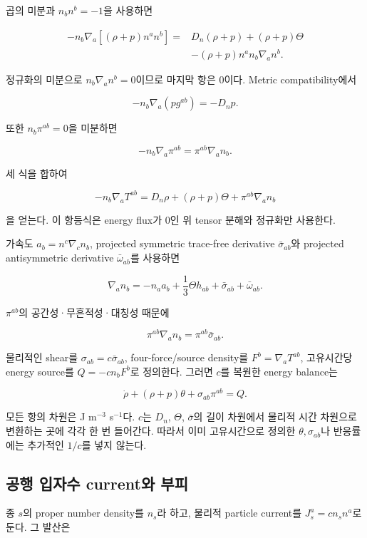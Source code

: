 곱의 미분과 \(n_bn^b=-1\)을 사용하면

\[
\begin{aligned}
-n_b\nabla_a[(\rho+p)n^an^b]
={}&D_n(\rho+p)+(\rho+p)\Theta\\
 &-(\rho+p)n^an_b\nabla_an^b.
\end{aligned}
\]

정규화의 미분으로 \(n_b\nabla_an^b=0\)이므로 마지막 항은 0이다. Metric compatibility에서

\[
-n_b\nabla_a(p g^{ab})=-D_np.
\]

또한 \(n_b\pi^{ab}=0\)을 미분하면

\[
-n_b\nabla_a\pi^{ab}
=\pi^{ab}\nabla_an_b.
\]

세 식을 합하여

\[
\boxed{
-n_b\nabla_aT^{ab}
=D_n\rho+(\rho+p)\Theta+\pi^{ab}\nabla_an_b
}
\tag{CG.1}
\]

을 얻는다. 이 항등식은 energy flux가 0인 위 tensor 분해와 정규화만 사용한다.

가속도 \(a_b=n^c\nabla_cn_b\), projected symmetric trace-free derivative \(\bar\sigma_{ab}\)와 projected antisymmetric derivative \(\bar\omega_{ab}\)를 사용하면

\[
\nabla_an_b=-n_aa_b+\frac13\Theta h_{ab}
+\bar\sigma_{ab}+\bar\omega_{ab}.
\]

\(\pi^{ab}\)의 공간성·무흔적성·대칭성 때문에

\[
\pi^{ab}\nabla_an_b=\pi^{ab}\bar\sigma_{ab}.
\]

물리적인 shear를 \(\sigma_{ab}=c\bar\sigma_{ab}\), four-force/source density를 \(F^b=\nabla_aT^{ab}\), 고유시간당 energy source를 \(Q=-c n_bF^b\)로 정의한다. 그러면 \(c\)를 복원한 energy balance는

\[
\boxed{
\dot\rho+(\rho+p)\theta+\sigma_{ab}\pi^{ab}=Q.
}
\tag{CG.2}
\]

모든 항의 차원은 J m\(^{-3}\) s\(^{-1}\)다. \(c\)는 \(D_n\), \(\Theta\), \(\bar\sigma\)의 길이 차원에서 물리적 시간 차원으로 변환하는 곳에 각각 한 번 들어간다. 따라서 이미 고유시간으로 정의한 \(\theta,\sigma_{ab}\)나 반응률에는 추가적인 \(1/c\)를 넣지 않는다.

\hypertarget{uxacf5uxd589-uxc785uxc790uxc218-currentuxc640-uxbd80uxd53c}{%
\subsection{공행 입자수 current와 부피}\label{uxacf5uxd589-uxc785uxc790uxc218-currentuxc640-uxbd80uxd53c}}

종 \(s\)의 proper number density를 \(n_s\)라 하고, 물리적 particle current를 \(J_s^a=c n_s n^a\)로 둔다. 그 발산은

